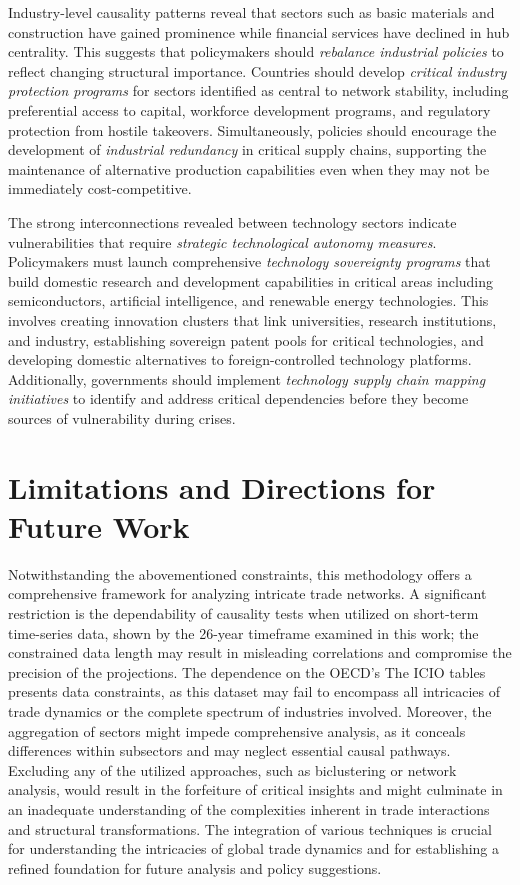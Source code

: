 \documentclass[preprint, 3p,
authoryear]{elsarticle} %
\begin{document}
Industry-level causality patterns reveal that sectors such as basic
materials and construction have gained prominence while financial
services have declined in hub centrality. This suggests that
policymakers should \emph{rebalance industrial policies} to reflect
changing structural importance. Countries should develop \emph{critical
industry protection programs} for sectors identified as central to
network stability, including preferential access to capital, workforce
development programs, and regulatory protection from hostile takeovers.
Simultaneously, policies should encourage the development of
\emph{industrial redundancy} in critical supply chains, supporting the
maintenance of alternative production capabilities even when they may
not be immediately cost-competitive.

The strong interconnections revealed between technology sectors indicate
vulnerabilities that require \emph{strategic technological autonomy
measures}. Policymakers must launch comprehensive \emph{technology
sovereignty programs} that build domestic research and development
capabilities in critical areas including semiconductors, artificial
intelligence, and renewable energy technologies. This involves creating
innovation clusters that link universities, research institutions, and
industry, establishing sovereign patent pools for critical technologies,
and developing domestic alternatives to foreign-controlled technology
platforms. Additionally, governments should implement \emph{technology
supply chain mapping initiatives} to identify and address critical
dependencies before they become sources of vulnerability during crises.

\section{Limitations and Directions for Future
Work}\label{limitations-and-directions-for-future-work}

Notwithstanding the abovementioned constraints, this methodology offers
a comprehensive framework for analyzing intricate trade networks. A
significant restriction is the dependability of causality tests when
utilized on short-term time-series data, shown by the 26-year timeframe
examined in this work; the constrained data length may result in
misleading correlations and compromise the precision of the projections.
The dependence on the OECD's The ICIO tables presents data constraints,
as this dataset may fail to encompass all intricacies of trade dynamics
or the complete spectrum of industries involved. Moreover, the
aggregation of sectors might impede comprehensive analysis, as it
conceals differences within subsectors and may neglect essential causal
pathways. Excluding any of the utilized approaches, such as biclustering
or network analysis, would result in the forfeiture of critical insights
and might culminate in an inadequate understanding of the complexities
inherent in trade interactions and structural transformations. The
integration of various techniques is crucial for understanding the
intricacies of global trade dynamics and for establishing a refined
foundation for future analysis and policy suggestions.
\end{document}

